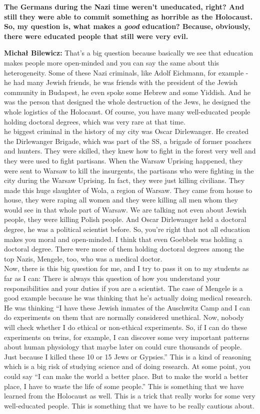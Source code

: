 \sloppy
\textbf{The Germans during the Nazi time weren’t uneducated, right? And still they were able to commit something as horrible as the Holocaust. So, my question is, what makes a \textit{good} education? Because, obviously, there were educated people that still were very evil.}

\textbf{Michał Bilewicz:} That’s a big question because basically we see that education makes people more open-minded and you can say the same about this heterogeneity. Some of these Nazi criminals, like Adolf Eichmann, for example - he had many Jewish friends, he was friends with the president of the Jewish community in Budapest, he even spoke some Hebrew and some Yiddish. And he was the person that designed the whole destruction of the Jews, he designed the whole logistics of the Holocaust. Of course, you have many well-educated people holding doctoral degrees, which was very rare at that time.\\
 he biggest criminal in the history of my city was Oscar Dirlewanger. He created the Dirlewanger Brigade, which was part of the SS, a brigade of former poachers and hunters. They were skilled, they knew how to fight in the forest very well and they were used to fight partisans. When the Warsaw Uprising happened, they were sent to Warsaw to kill the insurgents, the partisans who were fighting in the city during the Warsaw Uprising. In fact, they were just killing civilians. They made this huge slaughter of Wola, a region of Warsaw. They came from house to house, they were raping all women and they were killing all men whom they would see in that whole part of Warsaw. We are talking not even about Jewish people, they were killing Polish people. And Oscar Dirlewanger held a doctoral degree, he was a political scientist before. So, you're right that not all education makes you moral and open-minded. I think that even Goebbels was holding a doctoral degree. There were more of them holding doctoral degrees among the top Nazis, Mengele, too, who was a medical doctor.\\
Now, there is this big question for me, and I try to pass it on to my students as far as I can: There is always this question of how you understand your responsibilities and your duties if you are a scientist. The case of Mengele is a good example because he was thinking that he’s actually doing medical research. He was thinking ``I have these Jewish inmates of the Auschwitz Camp and I can do experiments on them that are normally considered unethical. Now, nobody will check whether I do ethical or non-ethical experiments. So, if I can do these experiments on twins, for example, I can discover some very important patterns about human physiology that maybe later on could cure thousands of people. Just because I killed these 10 or 15 Jews or Gypsies.'' This is a kind of reasoning which is a big risk of studying science and of doing research. At some point, you could say ``I can make the world a better place. But to make the world a better place, I have to waste the life of some people.'' This is something that we have learned from the Holocaust as well. This is a trick that really works for some very well-educated people. This is something that we have to be really cautious about.\\
